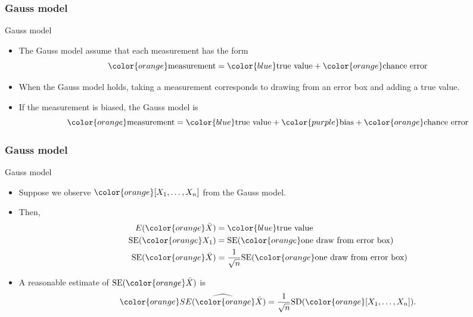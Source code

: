 \documentclass[handout]{beamer}
\begin{document}
   \begin{frame} \frametitle{Gauss model}

   \begin{block}
     {Gauss model}
     \begin{itemize}
     \item The Gauss model assume that each measurement has the form
     $$
     {\color{orange} \text{measurement}} = {\color{blue} \text{true value}} + {\color{orange} \text{chance error}}
     $$
     \item When the Gauss model holds, taking a measurement corresponds
     to drawing from an {\color{orange} error box} and adding
     a {\color{blue} true value}.

     \item If the measurement is biased, the Gauss model is
     $$
     {\color{orange} \text{measurement}} = {\color{blue} \text{true value}} + {\color{purple} \text{bias}} + {\color{orange} \text{chance error}}
     $$

     \end{itemize}
   \end{block}
   \end{frame}


   \begin{frame} \frametitle{Gauss model}

   \begin{block}
     {Gauss model}
     \begin{itemize}
     \item Suppose we observe ${\color{orange} [X_1, \dots, X_n]}$ from the Gauss model.
     \item Then,
     $$
     \begin{aligned}
     E({\color{orange} \bar{X}}) &= {\color{blue} \text{true value}} \\
     \text{SE}({\color{orange} X_1}) &= \text{SE}({\color{orange} \text{one draw from error box}}) \\
     \text{SE}({\color{orange} \bar{X}}) &= \frac{1}{\sqrt{n}} \text{SE}({\color{orange} \text{one draw from error box}}) \\
     \end{aligned}
     $$
     \item A reasonable estimate of $\text{SE}({\color{orange} \bar{X}})$ is
     $$
     {\color{orange} \widehat{SE({\color{orange} \bar{X}})}} = \frac{1}{\sqrt{n}} \text{SD}({\color{orange} [X_1, \dots, X_n]}).
     $$
     \end{itemize}
   \end{block}
   \end{frame}
\end{document}
